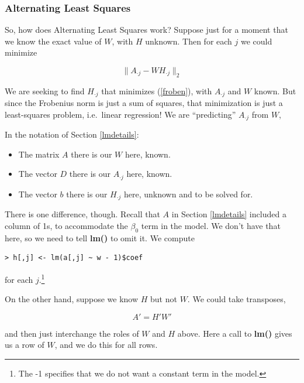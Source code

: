 \subsubsection{Alternating Least Squares}

So, how does Alternating Least Squares work?  Suppose just for a moment
that we know the exact value of $W$, with $H$ unknown.  Then for each
$j$ we could minimize

\begin{equation}
\label{errajwhj}
\|A_{\cdot j} - W H_{\cdot j}\|_2
\end{equation}

We are seeking to find $H_{\cdot j}$ that minimizes (\ref{froben}), with
$A_{\cdot j}$ and $W$ known.  But since the Frobenius norm is just a sum
of squares, that minimization is just a least-squares problem, i.e.\
linear regression!  We are ``predicting'' $A_{\cdot j}$ from $W$,

In the notation of Section \ref{lmdetails}:

\begin{itemize}

\item The matrix $A$ there is our $W$ here, known.

\item The vector $D$ there is our $A_{\cdot j}$ here, known.

\item The vector $b$ there is our $H_{\cdot j}$ here, unknown and to be
solved for.

\end{itemize} 

There is one difference, though.  Recall that $A$ in Section
\ref{lmdetails} included a column of 1s, to accommodate the $\beta_0$
term in the model.  We don't have that here, so we need to tell
\textbf{lm()} to omit it.  We compute 

\begin{lstlisting}
> h[,j] <- lm(a[,j] ~ w - 1)$coef
\end{lstlisting}

for each $j$.\footnote{The -1 specifies that we do not want a constant term in
the model.}

On the other hand, suppose we know $H$ but not $W$.  We could take 
transposes,

\begin{equation}
A' = H' W'
\end{equation}

and then just interchange the roles of $W$ and $H$ above.  Here a call
to {\bf lm()} gives us a row of $W$, and we do this for all rows.

